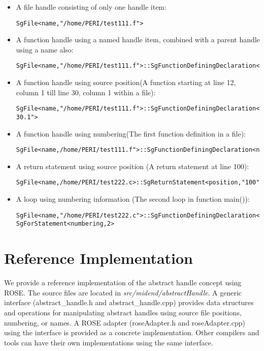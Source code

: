 \begin{itemize}
\item A file handle consisting of only one handle item: 
\begin{verbatim}
SgFile<name,"/home/PERI/test111.f">
\end{verbatim}

\item A function handle using a named handle item, combined with a parent handle using a name also: 

\begin{verbatim}
SgFile<name,"/home/PERI/test111.f">::SgFunctionDefiningDeclaration<name,"foo">
\end{verbatim}

\item A function handle using source position(A function starting at line 12, column 1 till line 30, column 1 within a file): 

\begin{verbatim}
SgFile<name,"/home/PERI/test111.f">::SgFunctionDefiningDeclaration<position,"12.1-30.1">

\end{verbatim}
\item A function handle using numbering(The first function definition in a file): 
\begin{verbatim}
SgFile<name,/home/PERI/test111.f">::SgFunctionDefiningDeclaration<numbering,1>
\end{verbatim}
\item A return statement using source position (A return statement at line 100):
\begin{verbatim}
SgFile<name,/home/PERI/test222.c>::SgReturnStatement<position,"100">

\end{verbatim}
\item A loop using numbering information (The second loop in function
main()): 
\begin{verbatim}
SgFile<name,"/home/PERI/test222.c">::SgFunctionDefiningDeclaration<name,"main">::
SgForStatement<numbering,2>
\end{verbatim}
\end{itemize}

\section{Reference Implementation}
We provide a reference implementation of the abstract handle concept using ROSE. 
The source files are located in \textit{src/midend/abstractHandle}.
A generic interface (abstract\_handle.h and abstract\_handle.cpp) provides
data structures and operations for manipulating abstract handles using source file positions, numbering, or names. 
A ROSE adapter (roseAdapter.h and roseAdapter.cpp) using the interface is provided as a concrete implementation. 
Other compilers and tools can have their own implementations using the same interface.  

